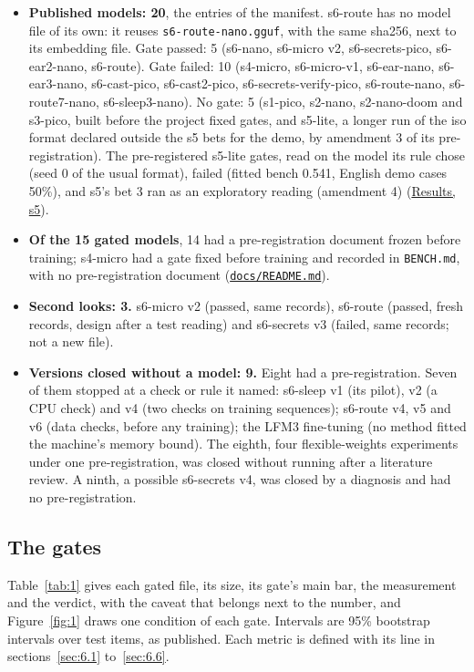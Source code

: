 \documentclass[10pt]{article}
\begin{document}
\begin{itemize}
\item \textbf{Published models: 20}, the entries of the manifest. s6-route has no model file of its own: it reuses \texttt{s6-route-nano.gguf}, with the same sha256, next to its embedding file. Gate passed: 5 (s6-nano, s6-micro v2, s6-secrets-pico, s6-ear2-nano, s6-route). Gate failed: 10 (s4-micro, s6-micro-v1, s6-ear-nano, s6-ear3-nano, s6-cast-pico, s6-cast2-pico, s6-secrets-verify-pico, s6-route-nano, s6-route7-nano, s6-sleep3-nano). No gate: 5 (s1-pico, s2-nano, s2-nano-doom and s3-pico, built before the project fixed gates, and s5-lite, a longer run of the iso format declared outside the s5 bets for the demo, by amendment 3 of its pre-registration). The pre-registered s5-lite gates, read on the model its rule chose (seed 0 of the usual format), failed (fitted bench 0.541, English demo cases 50\%), and s5's bet 3 ran as an exploratory reading (amendment 4) (\href{https://maxgfr.github.io/skycmd/results/\#s5-october-2026}{Results, s5}).
\item \textbf{Of the 15 gated models}, 14 had a pre-registration document frozen before training; s4-micro had a gate fixed before training and recorded in \texttt{BENCH.md}, with no pre-registration document (\href{https://github.com/maxgfr/skycmd/blob/main/docs/README.md}{\texttt{docs/\allowbreak{}README.md}}).
\item \textbf{Second looks: 3.} s6-micro v2 (passed, same records), s6-route (passed, fresh records, design after a test reading) and s6-secrets v3 (failed, same records; not a new file).
\item \textbf{Versions closed without a model: 9.} Eight had a pre-registration. Seven of them stopped at a check or rule it named: s6-sleep v1 (its pilot), v2 (a CPU check) and v4 (two checks on training sequences); s6-route v4, v5 and v6 (data checks, before any training); the LFM3 fine-tuning (no method fitted the machine's memory bound). The eighth, four flexible-weights experiments under one pre-registration, was closed without running after a literature review. A ninth, a possible s6-secrets v4, was closed by a diagnosis and had no pre-registration.
\end{itemize}

\subsection{The gates}\label{sec:4.2}

Table~\ref{tab:1} gives each gated file, its size, its gate's main bar, the measurement and the verdict, with the caveat that belongs next to the number, and Figure~\ref{fig:1} draws one condition of each gate. Intervals are 95\% bootstrap intervals over test items, as published. Each metric is defined with its line in sections~\ref{sec:6.1} to~\ref{sec:6.6}.
\end{document}

